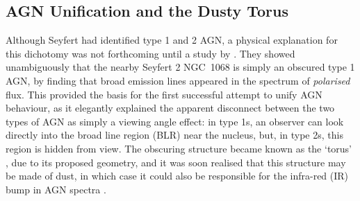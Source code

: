 




\subsection{AGN Unification and the Dusty Torus}
\label{agn_unification}

Although Seyfert had identified type 1 and 2 AGN, a physical explanation
for this dichotomy was not forthcoming until a study by \citet[][AM85]{antonucci1985}.
They showed unambiguously that the nearby Seyfert 2 NGC~1068 is simply an obscured
type 1 AGN, by finding that broad emission lines appeared in the spectrum of
{\em polarised} flux. This provided the basis for the first successful attempt
to unify AGN behaviour, as it elegantly 
explained the apparent disconnect between the two types of 
AGN as simply a viewing angle effect: in type 1s, an observer can look directly
into the broad line region (BLR) near the nucleus, but, in type 2s,
this region is hidden from view.
The obscuring structure became known as the `torus' \citep{krolik1986}, 
due to its proposed geometry, and it was soon realised that this structure
may be made of dust, in which case it could also be responsible for the infra-red (IR)
bump in AGN spectra \citep{neugebauer1979}.

